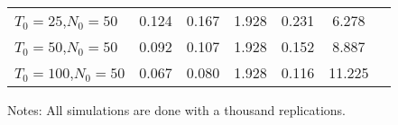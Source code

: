 \documentclass{article}
\begin{document}
\begin{table}[t]
{\begin{threeparttable}
\begin{tabular}{l c*{5}{c}}
$T_0 = 25$,$N_0 = 50$ & 0.124 & 0.167 & 1.928 & 0.231 & 6.278\\
$T_0 = 50$,$N_0 = 50$ & 0.092 & 0.107 & 1.928 & 0.152 & 8.887\\
$T_0 = 100$,$N_0 = 50$ & 0.067 & 0.080 & 1.928 & 0.116 & 11.225\\

\hline
\end{tabular}
\begin{tablenotes}
      \small
      \item Notes: All simulations are done with a thousand replications.
\end{tablenotes}

\end{threeparttable}}
\end{table}


\par 
\end{document}
